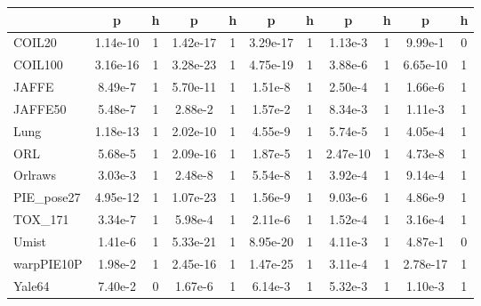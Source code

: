\documentclass[a4paper,fleqn]{cas-sc}
\begin{document}
\begin{table}[h!]
{\begin{tabular}{lcccccccccc}
		& \textbf{p} & \textbf{h} & \textbf{p} & \textbf{h} & \textbf{p} & \textbf{h} & \textbf{p} & \textbf{h} & \textbf{p} & \textbf{h} \\
		\midrule
		COIL20 & 1.14e-10 & 1 & 1.42e-17 & 1 & 3.29e-17 & 1 & 1.13e-3 & 1 & 9.99e-1 & 0 \\
		COIL100 & 3.16e-16 & 1 & 3.28e-23 & 1 & 4.75e-19 & 1 & 3.88e-6 & 1 & 6.65e-10 & 1 \\
		JAFFE & 8.49e-7 & 1 & 5.70e-11 & 1 & 1.51e-8 & 1 & 2.50e-4 & 1 & 1.66e-6 & 1 \\
		JAFFE50 & 5.48e-7 & 1 & 2.88e-2 & 1 & 1.57e-2 & 1 & 8.34e-3 & 1 & 1.11e-3 & 1 \\
		Lung & 1.18e-13 & 1 & 2.02e-10 & 1 & 4.55e-9 & 1 & 5.74e-5 & 1 & 4.05e-4 & 1 \\
		ORL & 5.68e-5 & 1 & 2.09e-16 & 1 & 1.87e-5 & 1 & 2.47e-10 & 1 & 4.73e-8 & 1 \\
		Orlraws & 3.03e-3 & 1 & 2.48e-8 & 1 & 5.54e-8 & 1 & 3.92e-4 & 1 & 9.14e-4 & 1 \\
		PIE\_pose27 & 4.95e-12 & 1 & 1.07e-23 & 1 & 1.56e-9 & 1 & 9.03e-6 & 1 & 4.86e-9 & 1 \\
		TOX\_171 & 3.34e-7 & 1 & 5.98e-4 & 1 & 2.11e-6 & 1 & 1.52e-4 & 1 & 3.16e-4 & 1 \\
		Umist & 1.41e-6 & 1 & 5.33e-21 & 1 & 8.95e-20 & 1 & 4.11e-3 & 1 & 4.87e-1 & 0 \\
		warpPIE10P & 1.98e-2 & 1 & 2.45e-16 & 1 & 1.47e-25 & 1 & 3.11e-4 & 1 & 2.78e-17 & 1 \\
		Yale64 & 7.40e-2 & 0 & 1.67e-6 & 1 & 6.14e-3 & 1 & 5.32e-3 & 1 & 1.10e-3 & 1 \\
		\bottomrule
	\end{tabular}
}
	\label{tab:t_test_nmi_cdrnmf}
\end{table}
\end{document}
